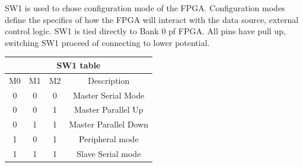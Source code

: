 SW1 is used to chose configuration mode of the FPGA. Configuration modes define the specifics of how the FPGA will interact with the data source, external control logic. SW1 is tied directly to Bank 0 pf FPGA. All pins have pull up, switching SW1 proceed of connecting to lower potential.
\begin{longtable}{|c|c|c|c|} \hline
			\multicolumn{4}{|c|}{SW1 table}\\ \hline
	M0 & M1 & M2 & Description \\ \hline
	0 & 0 & 0 & Master Serial Mode \\ \hline
	0 & 0 & 1 & Master Parallel Up \\ \hline
	0 & 1 & 1 & Master Parallel Down \\ \hline
	1 & 0 & 1 & Peripheral mode \\ \hline
	1 & 1 & 1 & Slave Serial mode \\ \hline
	
\end{longtable}	
